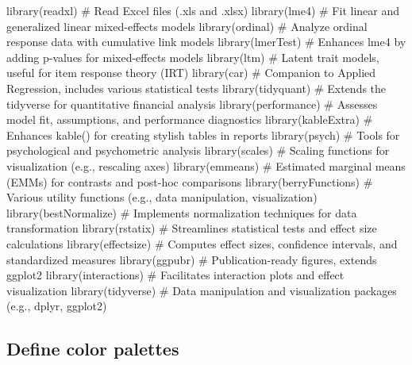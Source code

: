 \documentclass[
  bookmarksnumbered]{article}
\newenvironment{Shaded}{\begin{snugshade}}{\end{snugshade}}
\newcommand{\CommentTok}[1]{\textcolor[rgb]{0.50,0.62,0.50}{#1}}
\newcommand{\FunctionTok}[1]{\textcolor[rgb]{0.94,0.94,0.56}{#1}}
\newcommand{\NormalTok}[1]{\textcolor[rgb]{0.80,0.80,0.80}{#1}}
\begin{document}
\begin{Shaded}
\begin{Highlighting}[]
\FunctionTok{library}\NormalTok{(readxl) }\CommentTok{\# Read Excel files (.xls and .xlsx)}
\FunctionTok{library}\NormalTok{(lme4) }\CommentTok{\# Fit linear and generalized linear mixed{-}effects models}
\FunctionTok{library}\NormalTok{(ordinal) }\CommentTok{\# Analyze ordinal response data with cumulative link models}
\FunctionTok{library}\NormalTok{(lmerTest) }\CommentTok{\# Enhances lme4 by adding p{-}values for mixed{-}effects models}
\FunctionTok{library}\NormalTok{(ltm) }\CommentTok{\# Latent trait models, useful for item response theory (IRT)}
\FunctionTok{library}\NormalTok{(car) }\CommentTok{\# Companion to Applied Regression, includes various statistical tests}
\FunctionTok{library}\NormalTok{(tidyquant) }\CommentTok{\# Extends the tidyverse for quantitative financial analysis}
\FunctionTok{library}\NormalTok{(performance) }\CommentTok{\# Assesses model fit, assumptions, and performance diagnostics}
\FunctionTok{library}\NormalTok{(kableExtra) }\CommentTok{\# Enhances \textasciigrave{}kable()\textasciigrave{} for creating stylish tables in reports}
\FunctionTok{library}\NormalTok{(psych) }\CommentTok{\# Tools for psychological and psychometric analysis}
\FunctionTok{library}\NormalTok{(scales) }\CommentTok{\# Scaling functions for visualization (e.g., rescaling axes)}
\FunctionTok{library}\NormalTok{(emmeans) }\CommentTok{\# Estimated marginal means (EMMs) for contrasts and post{-}hoc comparisons}
\FunctionTok{library}\NormalTok{(berryFunctions) }\CommentTok{\# Various utility functions (e.g., data manipulation, visualization)}
\FunctionTok{library}\NormalTok{(bestNormalize) }\CommentTok{\# Implements normalization techniques for data transformation}
\FunctionTok{library}\NormalTok{(rstatix) }\CommentTok{\# Streamlines statistical tests and effect size calculations}
\FunctionTok{library}\NormalTok{(effectsize) }\CommentTok{\# Computes effect sizes, confidence intervals, and standardized measures}
\FunctionTok{library}\NormalTok{(ggpubr) }\CommentTok{\# Publication{-}ready figures, extends \textasciigrave{}ggplot2\textasciigrave{}}
\FunctionTok{library}\NormalTok{(interactions) }\CommentTok{\# Facilitates interaction plots and effect visualization}
\FunctionTok{library}\NormalTok{(tidyverse) }\CommentTok{\# Data manipulation and visualization packages (e.g., dplyr, ggplot2)}
\end{Highlighting}
\end{Shaded}

\subsection{Define color palettes}\label{define-color-palettes}
\end{document}
